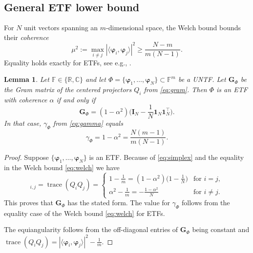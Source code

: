 \documentclass[a4paper]{amsart}
\numberwithin{equation}{section}
\newtheorem{lemma}[theorem]{Lemma}
\DeclareMathOperator{\trace}{trace}
\begin{document}
\subsection{General ETF lower bound}

For $N$ unit vectors spanning an $m$-dimensional space, the Welch bound bounds their \emph{coherence}
\begin{equation}\label{eq:welch}
    \mu^2
    :=\max_{i\ne j}
      |\langle\bm\varphi_i,\bm\varphi_j\rangle|^2
    \ge \frac{N-m}{m(N-1)}.
\end{equation}
Equality holds exactly for ETFs, see e.g., \cite[Theorem~1.10.1]{Christensen16}.

\begin{lemma}\label{etfcenteredgram}
    Let $\mathds F\in\{\mathds R,\mathds C\}$ and let $\Phi = \{\bm\varphi_1,\dots,\bm\varphi_N\}\subset\mathds F^m$ be a UNTF.
    Let $\bm G_\Phi$ be the Gram matrix of the centered projectors $Q_i$ from \eqref{eq:gram}.
    Then $\Phi$ is an ETF with coherence $\alpha$ if and only if
    \begin{equation*}
        \bm G_\Phi
        = (1-\alpha^2)
        \Big(\bm I_N-\frac1N\bm 1_N\bm 1_N^\top\Big).
    \end{equation*}
    In that case, $\gamma_\Phi$ from \eqref{eq:gamma} equals
    \begin{equation*}
        \gamma_\Phi = 1-\alpha^2 = \frac{N(m-1)}{m(N-1)}.
    \end{equation*}
\end{lemma}

\begin{proof}
    Suppose $\{\bm\varphi_1,\dots,\bm\varphi_N\}$ is an ETF.
    Because of \eqref{eq:simplex} and the equality in the Welch bound \eqref{eq:welch} we have
    \begin{equation*}
        [\bm G_\Phi]_{i,j}
        = \trace(Q_iQ_j)
        = \begin{cases}
            1-\frac 1m = (1-\alpha^2)\Big(1-\frac 1N\Big) & \text{for }i=j,\\
            \alpha^2-\frac 1m = -\frac{1-\alpha^2}{N} & \text{for }i\ne j.
        \end{cases}
    \end{equation*}
    This proves that $\bm G_\Phi$ has the stated form.
    The value for $\gamma_\Phi$ follows from the equality case of the Welch bound \eqref{eq:welch} for ETFs.

    The equiangularity follows from the off-diagonal entries of $\bm G_\Phi$ being constant and $\trace(Q_iQ_j) = |\langle\bm\varphi_i,\bm\varphi_j\rangle|^2-\frac1m$.
\end{proof}
\end{document}

